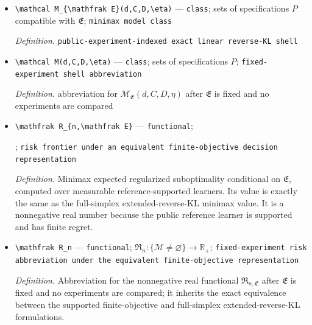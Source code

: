 \documentclass{article}
\begin{document}
\begin{itemize}
  \par\smallskip\noindent\emph{Definition.} \texttt{fixed universal confidence-\allowbreak{}radius constant}
  \item \texttt{\textbackslash{}\allowbreak{}mathcal M\_\allowbreak{}\{\textbackslash{}\allowbreak{}mathfrak E\}\allowbreak{}(d,\allowbreak{}C,\allowbreak{}D,\allowbreak{}\textbackslash{}\allowbreak{}eta)} --- \texttt{class}; sets of specifications \(P\) compatible with \(\mathfrak E\); \texttt{minimax model class}
  \par\smallskip\noindent\emph{Definition.} \texttt{public-\allowbreak{}experiment-\allowbreak{}indexed exact linear reverse-\allowbreak{}KL shell}
  \item \texttt{\textbackslash{}\allowbreak{}mathcal M(d,\allowbreak{}C,\allowbreak{}D,\allowbreak{}\textbackslash{}\allowbreak{}eta)} --- \texttt{class}; sets of specifications \(P\); \texttt{fixed-\allowbreak{}experiment shell abbreviation}
  \par\smallskip\noindent\emph{Definition.} abbreviation for \(\mathcal M_{\mathfrak E}(d,C,D,\eta)\) after \(\mathfrak E\) is fixed and no experiments are compared
  \item \texttt{\textbackslash{}\allowbreak{}mathfrak R\_\allowbreak{}\{n,\allowbreak{}\textbackslash{}\allowbreak{}mathfrak E\}\allowbreak{}} --- \texttt{functional}; \par\noindent {}\par\noindent; \texttt{risk frontier under an equivalent finite-\allowbreak{}objective decision representation}
  \par\smallskip\noindent\emph{Definition.} Minimax expected regularized suboptimality conditional on \(\mathfrak E\), computed over measurable reference-supported learners. Its value is exactly the same as the full-simplex extended-reverse-KL minimax value. It is a nonnegative real number because the public reference learner is supported and has finite regret.
  \item \texttt{\textbackslash{}\allowbreak{}mathfrak R\_\allowbreak{}n} --- \texttt{functional}; \(\mathfrak R_n:\{\mathcal M\ne\varnothing\}\to\mathbb R_+\); \texttt{fixed-\allowbreak{}experiment risk abbreviation under the equivalent finite-\allowbreak{}objective representation}
  \par\smallskip\noindent\emph{Definition.} Abbreviation for the nonnegative real functional \(\mathfrak R_{n,\mathfrak E}\) after \(\mathfrak E\) is fixed and no experiments are compared; it inherits the exact equivalence between the supported finite-objective and full-simplex extended-reverse-KL formulations.

\end{itemize}
\end{document}
